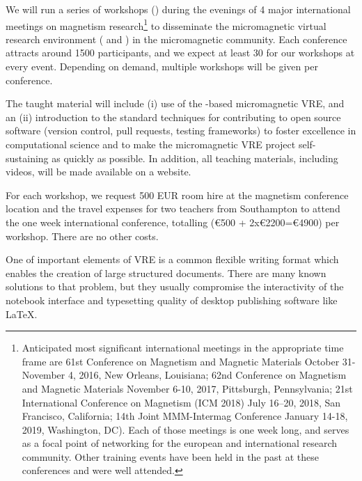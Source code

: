 \begin{workpackage}
\begin{tasklist}
\begin{task}[title=Micromagnetic VRE dissemination workshops,
id=dissemination-of-oommf-nb-workshops,lead=USO,PM=6]
We will run a series of workshops
() during the evenings of 4 major
international meetings on magnetism research\footnote{Anticipated most
  significant international meetings in the appropriate time frame are
  61st Conference on Magnetism and Magnetic Materials October
  31-November 4, 2016, New Orleans, Louisiana; 62nd Conference on
  Magnetism and Magnetic Materials November 6-10, 2017, Pittsburgh,
  Pennsylvania; 21st International Conference on Magnetism (ICM 2018)
  July 16–20, 2018, San Francisco, California; 14th Joint MMM-Intermag
  Conference January 14-18, 2019, Washington, DC). Each of those
  meetings is one week long, and serves as a focal point of networking
  for the european and international research community. Other training events have been held in the
past at these conferences and were well attended.} to
disseminate the micromagnetic virtual research environment
( and
) in the
micromagnetic community. Each conference
attracts around 1500 participants, and we expect at least 30 for our
workshops at every event. Depending on demand, multiple workshops
will be given per conference.

The taught material will include (i) use of the \Jupyter-based
micromagnetic VRE, and an (ii) introduction to the standard techniques
for contributing to open source software (version control, pull
requests, testing frameworks) to foster excellence in computational
science and to make the micromagnetic VRE project self-sustaining as quickly
as possible. In addition, all teaching materials, including videos,
will be made available on a website.

For each workshop, we request 500 EUR room hire at the magnetism conference
location and the travel expenses for two teachers from Southampton to
attend the one week international conference, totalling (\euro{500} +
2x\euro{2200}=\euro{4900}) per workshop. There are no other costs.
\end{task}

\begin{task}[title=Demonstrator: Interactive books,
id=ibook,lead=US,PM=30]

One of important elements of VRE is a common flexible writing format which
enables the creation of large structured documents. There are many
known solutions to that problem, but they usually compromise the
interactivity of the notebook interface and typesetting quality of desktop
publishing software like LaTeX.


\end{task}
\end{tasklist}
\end{workpackage}
